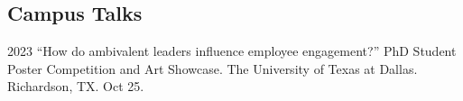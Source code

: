 \documentclass[11pt,letterpaper]{report} %
\begin{document}


    \subsection*{Campus Talks}

    \begin{tablist}


        \item[2023] \tab{}\enquote{How do ambivalent leaders influence employee engagement?} PhD Student Poster Competition and Art Showcase. The University of Texas at Dallas. Richardson, TX. Oct 25.

    \end{tablist}








\end{document}
